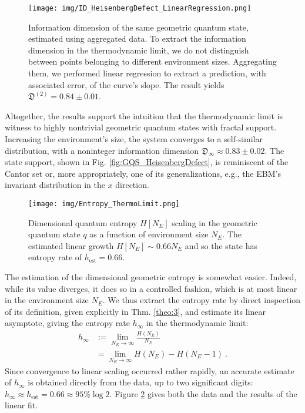 \documentclass[draft,nofootinbib,pre,twocolumn,showkeys,superscriptaddress,preprintnumbers,floatfix]{revtex4-1}
\newcommand{\1}{\mathbbm{1}}
\begin{document}
\begin{figure}[h]
\centering
\texttt{[image: img/ID\_HeisenbergDefect\_LinearRegression.png]}
\caption{Information dimension of the same geometric quantum state, estimated
	using aggregated data. To extract the information dimension in the
	thermodynamic limit, we do not distinguish between points belonging to
	different environment sizes. Aggregating them, we performed linear
	regression to extract a prediction, with associated error, of the
	curve's slope. The result yields $\mathfrak{D}^{(2)}= 0.84 \pm 0.01$.
	}
\label{fig:ID_LinearRegression} 
\end{figure}

Altogether, the results support the intuition that the thermodynamic limit is
witness to highly nontrivial geometric quantum states with fractal support.
Increasing the environment's size, the system converges to a self-similar
distribution, with a noninteger information dimension
$\mathfrak{D}_{\infty}\approx 0.83 \pm 0.02$. The state support, shown in Fig.
\ref{fig:GQS_HeisenbergDefect}, is reminiscent of the Cantor set or, more
appropriately, one of its generalizations, e.g., the EBM's invariant
distribution in the $x$ direction.

\begin{figure}[ht]
\centering
\texttt{[image: img/Entropy\_ThermoLimit.png]}
\caption{Dimensional quantum entropy $H[N_E]$ scaling in the geometric quantum
	state $q$ as a function of environment size $N_E$. The estimated linear
	growth $H[N_E] \sim 0.66 N_E$ and so the state has entropy rate of
	$h_\text{est} = 0.66$.
	}
\label{fig:Entropy_HeisenbergDefect} 
\end{figure}

The estimation of the dimensional geometric entropy is somewhat easier.
Indeed, while its value diverges, it does so in a controlled fashion, which is
at most linear in the environment size $N_E$. We thus extract the entropy rate
by direct inspection of its definition, given explicitly in Thm. \ref{theo:3},
and estimate its linear asymptote, giving the entropy rate $h_\infty$ in the
thermodynamic limit:
\begin{align*}
h_{\infty} & := \lim_{N_E \to \infty} \frac{H(N_E)}{N_E} \\
  & = \lim_{N_E \to \infty} H(N_E)-H(N_E-1)
  ~.
\end{align*}
Since convergence to linear scaling occurred rather rapidly, an accurate
estimate of $h_{\infty}$ is obtained directly from the data, up to two
significant digits: $h_{\infty} \approx h_\text{est} = 0.66 \approx 95\% \log
2$. Figure \ref{fig:Entropy_HeisenbergDefect} gives both the data and the
results of the linear fit.
\end{document}
